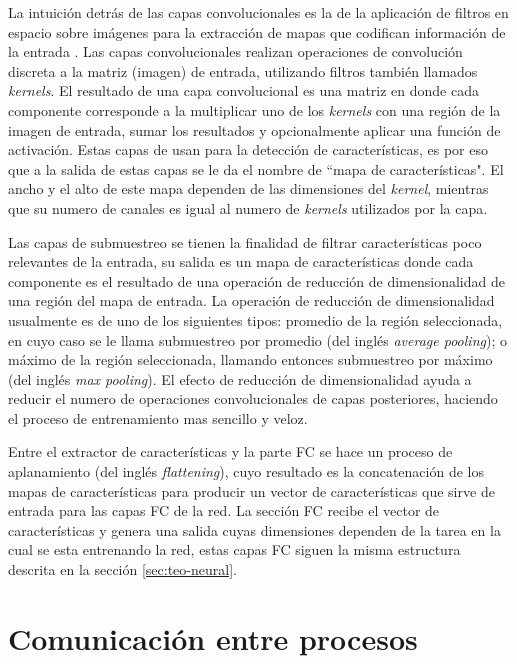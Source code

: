 La intuición detrás de las capas convolucionales es la de la aplicación de filtros en espacio sobre imágenes para la extracción de mapas que codifican información de la entrada \cite{Gupta2013} \cite{Coady2019}. Las capas convolucionales realizan operaciones de convolución discreta a la matriz (imagen) de entrada, utilizando filtros también llamados \textit{kernels}. El resultado de una capa convolucional es una matriz en donde cada componente corresponde a la multiplicar uno de los \textit{kernels} con una región de la imagen de entrada, sumar los resultados y opcionalmente aplicar una función de activación. Estas capas de usan para la detección de características, es por eso que a la salida de estas capas se le da el nombre de ``mapa de características". El ancho y el alto de este mapa dependen de las dimensiones del \textit{kernel}, mientras que su numero de canales es igual al numero de \textit{kernels} utilizados por la capa.

Las capas de submuestreo se tienen la finalidad de filtrar características poco relevantes de la entrada, su salida es un mapa de características donde cada componente es el resultado de una operación de reducción de dimensionalidad de una región del mapa de entrada. La operación de reducción de dimensionalidad usualmente es de uno de los siguientes tipos: promedio de la región seleccionada, en cuyo caso se le llama submuestreo por promedio (del inglés \textit{average pooling}); o máximo de la región seleccionada, llamando entonces submuestreo por máximo (del inglés \textit{max pooling}). El efecto de reducción de dimensionalidad ayuda a reducir el numero de operaciones convolucionales de capas posteriores, haciendo el proceso de entrenamiento mas sencillo y veloz.

Entre el extractor de características y la parte FC se hace un proceso de aplanamiento (del inglés \textit{flattening}), cuyo resultado es la concatenación de los mapas de características para producir un vector de características que sirve de entrada para las capas FC de la red. La sección FC recibe el vector de características y genera una salida cuyas dimensiones dependen de la tarea en la cual se esta entrenando la red, estas capas FC siguen la misma estructura descrita en la sección \ref{sec:teo-neural}.

\section{Comunicación entre procesos}
\label{sec:teo-interprocess}

